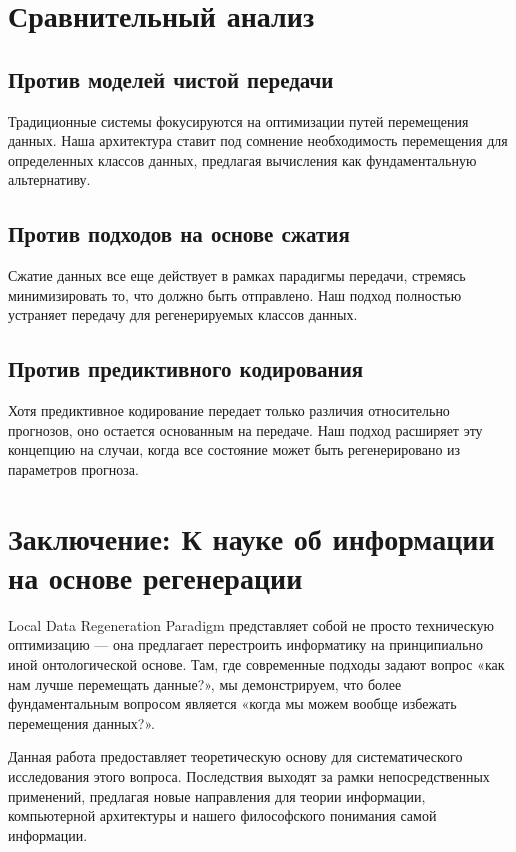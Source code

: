 \documentclass[11pt,a4paper]{article}
\begin{document}
\section{Сравнительный анализ}

\subsection{Против моделей чистой передачи}

Традиционные системы фокусируются на оптимизации путей перемещения данных. Наша архитектура ставит под сомнение необходимость перемещения для определенных классов данных, предлагая вычисления как фундаментальную альтернативу.

\subsection{Против подходов на основе сжатия}

Сжатие данных все еще действует в рамках парадигмы передачи, стремясь минимизировать то, что должно быть отправлено. Наш подход полностью устраняет передачу для регенерируемых классов данных.

\subsection{Против предиктивного кодирования}

Хотя предиктивное кодирование передает только различия относительно прогнозов, оно остается основанным на передаче. Наш подход расширяет эту концепцию на случаи, когда все состояние может быть регенерировано из параметров прогноза.

\section{Заключение: К науке об информации на основе регенерации}

Local Data Regeneration Paradigm представляет собой не просто техническую оптимизацию — она предлагает перестроить информатику на принципиально иной онтологической основе. Там, где современные подходы задают вопрос «как нам лучше перемещать данные?», мы демонстрируем, что более фундаментальным вопросом является «когда мы можем вообще избежать перемещения данных?».

Данная работа предоставляет теоретическую основу для систематического исследования этого вопроса. Последствия выходят за рамки непосредственных применений, предлагая новые направления для теории информации, компьютерной архитектуры и нашего философского понимания самой информации.
\end{document}
